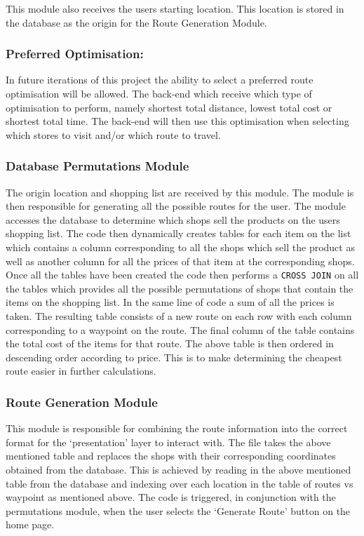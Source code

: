 \documentclass[10pt,twocolumn]{witseiepaper}
\begin{document}
		This module also receives the users starting location. This location is stored in the database as the origin for the Route Generation Module.\\
		
		\subsubsection*{Preferred Optimisation:} In future iterations of this project the ability to select a preferred route optimisation will be allowed. The back-end which receive which type of optimisation to perform, namely shortest total distance, lowest total cost or shortest total time. The back-end will then use this optimisation when selecting which stores to visit and/or which route to travel.
		
		\subsubsection{Database Permutations Module}
		
		The origin location and shopping list are received by this module. The module is then responsible for generating all the possible routes for the user. The module accesses the database to determine which shops sell the products on the users shopping list. The code then dynamically creates tables for each item on the list which contains a column corresponding to all the shops which sell the product as well as another column for all the prices of that item at the corresponding shops. \\
		
		Once all the tables have been created the code then performs a \texttt{CROSS JOIN} on all the tables which provides all the possible permutations of shops that contain the items on the shopping list. In the same line of code a sum of all the prices is taken. The resulting table consists of a new route on each row with each column corresponding to a waypoint on the route. The final column of the table contains the total cost of the items for that route. The above table is then ordered in descending order according to price. This is to make determining the cheapest route easier in further calculations.
		
		\subsubsection{Route Generation Module}
		
		This module is responsible for combining the route information into the correct format for the `presentation' layer to interact with. The file takes the above mentioned table and replaces the shops with their corresponding coordinates obtained from the database. This is achieved by reading in the above mentioned table from the database and indexing over each location in the table of routes vs waypoint as mentioned above. The code is triggered, in conjunction with the permutations module, when the user selects the `Generate Route' button on the home page. \\
		
\end{document}
